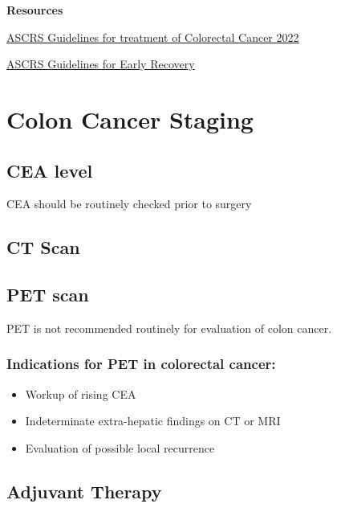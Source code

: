 \documentclass[
]{book}
\providecommand{\tightlist}{%
  \setlength{\itemsep}{0pt}\setlength{\parskip}{0pt}}
\begin{document}
\textbf{Resources}

\href{https://fascrs.org/ascrs/media/files/downloads/2022-Colon-Cancer-CPG.pdf}{ASCRS Guidelines for treatment of Colorectal Cancer 2022}

\href{https://fascrs.org/ascrs/media/files/downloads/Clinical\%20Practice\%20Guidelines/clinical_practice_guidelines_for_enhanced_recovery-3.pdf}{ASCRS Guidelines for Early Recovery}

\hypertarget{colon-cancer-staging}{%
\chapter{Colon Cancer Staging}\label{colon-cancer-staging}}

\hypertarget{cea-level}{%
\section{CEA level}\label{cea-level}}

CEA should be routinely checked prior to surgery

\hypertarget{ct-scan}{%
\section{CT Scan}\label{ct-scan}}

\hypertarget{pet-scan}{%
\section{PET scan}\label{pet-scan}}

PET is not recommended routinely for evaluation of colon cancer.\citep{vogel148}

\hypertarget{indications-for-pet-in-colorectal-cancer}{%
\subsection{Indications for PET in colorectal cancer:}\label{indications-for-pet-in-colorectal-cancer}}

\begin{itemize}
\tightlist
\item
  Workup of rising CEA
\item
  Indeterminate extra-hepatic findings on CT or MRI
\item
  Evaluation of possible local recurrence
\end{itemize}

\hypertarget{adjuvant-therapy}{%
\section{Adjuvant Therapy}\label{adjuvant-therapy}}
\end{document}
